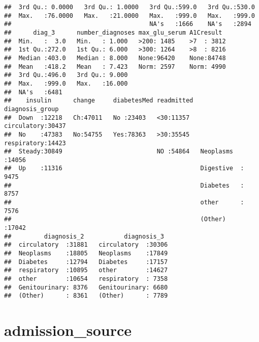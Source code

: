 \documentclass[]{article}
\begin{document}
\begin{verbatim}
##  3rd Qu.: 0.0000   3rd Qu.: 1.0000   3rd Qu.:599.0   3rd Qu.:530.0  
##  Max.   :76.0000   Max.   :21.0000   Max.   :999.0   Max.   :999.0  
##                                      NA's   :1666    NA's   :2894   
##      diag_3      number_diagnoses max_glu_serum A1Cresult   
##  Min.   :  3.0   Min.   : 1.000   >200: 1485    >7  : 3812  
##  1st Qu.:272.0   1st Qu.: 6.000   >300: 1264    >8  : 8216  
##  Median :403.0   Median : 8.000   None:96420    None:84748  
##  Mean   :418.2   Mean   : 7.423   Norm: 2597    Norm: 4990  
##  3rd Qu.:496.0   3rd Qu.: 9.000                             
##  Max.   :999.0   Max.   :16.000                             
##  NA's   :6481                                               
##    insulin      change     diabetesMed readmitted     diagnosis_group 
##  Down  :12218   Ch:47011   No :23403   <30:11357   circulatory:30437  
##  No    :47383   No:54755   Yes:78363   >30:35545   respiratory:14423  
##  Steady:30849                          NO :54864   Neoplasms  :14056  
##  Up    :11316                                      Digestive  : 9475  
##                                                    Diabetes   : 8757  
##                                                    other      : 7576  
##                                                    (Other)    :17042  
##         diagnosis_2           diagnosis_3   
##  circulatory  :31881   circulatory  :30306  
##  Neoplasms    :18805   Neoplasms    :17849  
##  Diabetes     :12794   Diabetes     :17157  
##  respiratory  :10895   other        :14627  
##  other        :10654   respiratory  : 7358  
##  Genitourinary: 8376   Genitourinary: 6680  
##  (Other)      : 8361   (Other)      : 7789
\end{verbatim}

\section{admission\_source}\label{admission_source}
\end{document}
